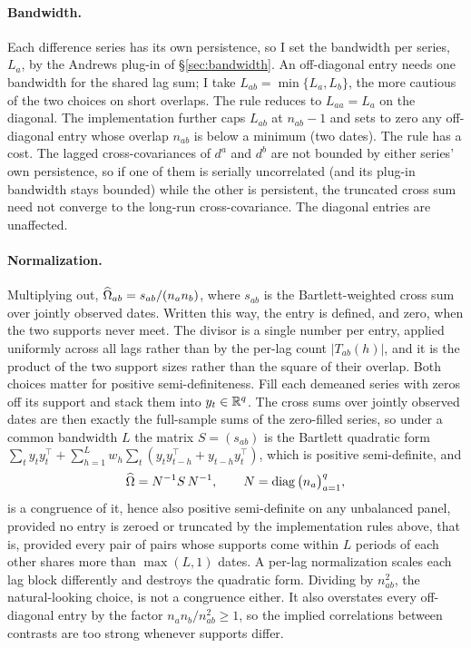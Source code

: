 \paragraph{Bandwidth.} Each difference series has its own persistence, so I set the
bandwidth per series, $L_a$, by the Andrews plug-in of \S\ref{sec:bandwidth}. An
off-diagonal entry needs one bandwidth for the shared lag sum; I take
$L_{ab}=\min\{L_a,L_b\}$, the more cautious of the two choices on short overlaps. The
rule reduces to $L_{aa}=L_a$ on the diagonal. The implementation further caps $L_{ab}$ at
$n_{ab}-1$ and sets to zero any off-diagonal entry whose overlap $n_{ab}$ is below a
minimum (two dates). The rule has a cost. The lagged cross-covariances of $d^a$ and $d^b$
are not bounded by either series' own persistence, so if one of them is serially
uncorrelated (and its plug-in bandwidth stays bounded) while the other is persistent,
the truncated cross sum need not converge to the long-run cross-covariance. The diagonal
entries are unaffected.

\paragraph{Normalization.} Multiplying out, $\widehat{\Omega}_{ab} = s_{ab}/(n_a n_b)$, where
$s_{ab}$ is the Bartlett-weighted cross sum over jointly observed dates. Written this
way, the entry is defined, and zero, when the two supports never meet. The divisor is a
single number per entry, applied uniformly across all lags rather than by the per-lag
count $|T_{ab}(h)|$, and it is the product of the two support sizes rather than the
square of their overlap. Both choices matter for positive semi-definiteness. Fill each
demeaned series with zeros off its support and stack them into $y_t\in\mathbb{R}^q$. The
cross sums over jointly observed dates are then exactly the full-sample sums of the
zero-filled series, so under a common bandwidth $L$ the matrix
$S=(s_{ab})$ is the Bartlett quadratic form
$\sum_t y_t y_t^\top + \sum_{h=1}^{L} w_h \sum_t (y_t y_{t-h}^\top + y_{t-h}y_t^\top)$,
which is positive semi-definite, and
\begin{equation}
  \widehat{\Omega} = N^{-1} S\, N^{-1},
  \qquad N = \operatorname{diag}\big(n_a\big)_{a=1}^{q},
  \label{eq:omega-congruence}
\end{equation}
is a congruence of it, hence also positive semi-definite on any unbalanced panel,
provided no entry is zeroed or truncated by the implementation rules above, that is,
provided every pair of pairs whose supports come within $L$ periods of each other shares
more than $\max(L,1)$ dates. A per-lag normalization scales each lag block differently
and destroys the quadratic form. Dividing by $n_{ab}^2$, the natural-looking choice, is
not a congruence either. It also overstates every off-diagonal entry by the factor
$n_a n_b/n_{ab}^2\ge 1$, so the implied correlations between contrasts are too strong
whenever supports differ.

